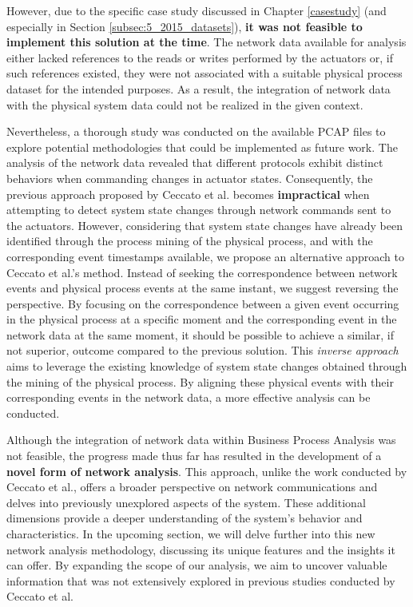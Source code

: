 \bigskip
However, due to the specific case study discussed in Chapter \ref{casestudy} (and especially in Section \ref{subsec:5_2015_datasets}), \textbf{it was not feasible to implement this solution at the time}. The network data available for analysis either lacked references to the reads or writes performed by the actuators or, if such references existed, they were not associated with a suitable physical process dataset for the intended purposes. As a result, the integration of network data with the physical system data could not be realized in the given context.

\bigskip
Nevertheless, a thorough study was conducted on the available PCAP files to explore potential methodologies that could be implemented as future work. The analysis of the network data revealed that different protocols exhibit distinct behaviors when commanding changes in actuator states. Consequently, the previous approach proposed by Ceccato et al. becomes \textbf{impractical} when attempting to detect system state changes through network commands sent to the actuators.\newline
However, considering that system state changes have already been identified through the process mining of the physical process, and with the corresponding event timestamps available, we propose an alternative approach to Ceccato et al.'s method. Instead of seeking the correspondence between network events and physical process events at the same instant, we suggest reversing the perspective. By focusing on the correspondence between a given event occurring in the physical process at a specific moment and the corresponding event in the network data at the same moment, it should be possible to achieve a similar, if not superior, outcome compared to the previous solution.\newline
This \textit{inverse approach} aims to leverage the existing knowledge of system state changes obtained through the mining of the physical process. By aligning these physical events with their corresponding events in the network data, a more effective analysis can be conducted.

\bigskip
Although the integration of network data within Business Process Analysis was not feasible, the progress made thus far has resulted in the development of a \textbf{novel form of network analysis}. This approach, unlike the work conducted by Ceccato et al., offers a broader perspective on network communications and delves into previously unexplored aspects of the system. These additional dimensions provide a deeper understanding of the system's behavior and characteristics.\newline
In the upcoming section, we will delve further into this new network analysis methodology, discussing its unique features and the insights it can offer. By expanding the scope of our analysis, we aim to uncover valuable information that was not extensively explored in previous studies conducted by Ceccato et al.

